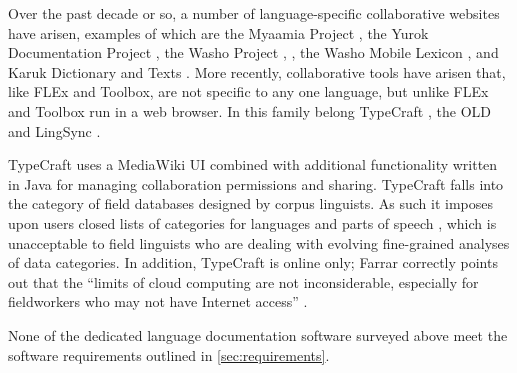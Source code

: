 \documentclass[11pt]{article}
\newcommand{\smalltodo}[2][]
    {\todo[caption={#2}, #1]
    {\tiny#2\normalsize}}
\begin{document}
Over the past decade or so, a number of language-specific collaborative 
websites have arisen, examples of which are the Myaamia Project
\cite{Myaamia:2001}, the Yurok Documentation Project \cite{Yurok:2001:Online},
the Washo Project \cite{Washo:2005:Online}, \cite{Cihlar:2008}, the Washo
Mobile Lexicon \cite{WashoMobile:2008:Online}, and Karuk Dictionary and Texts
\cite{Karuk:2009:Online}. 
More recently, collaborative  tools have arisen that, like FLEx and Toolbox,
are not specific to any one language, but unlike FLEx and Toolbox run in a web
browser.  In this family belong TypeCraft \cite{Beermann:2012}, the OLD
\cite{dunham2014docs} and LingSync \cite{lingsync:2012}.


TypeCraft uses a MediaWiki UI combined with additional functionality written in
Java for managing collaboration permissions and sharing. TypeCraft falls into
the category of field databases designed by corpus linguists. As such it
imposes upon users closed lists of categories for languages and parts of speech
\cite{Farrar:2010}, which is unacceptable to field linguists who are
dealing with evolving fine-grained analyses of data categories. In addition,
TypeCraft is online only; Farrar correctly points out that the ``limits of cloud computing
are not inconsiderable, especially for fieldworkers who may not have Internet
access'' \cite{Farrar:2010}.%

None of the dedicated language documentation software surveyed above 
meet the software requirements outlined in \autoref{sec:requirements}.%



\end{document}
